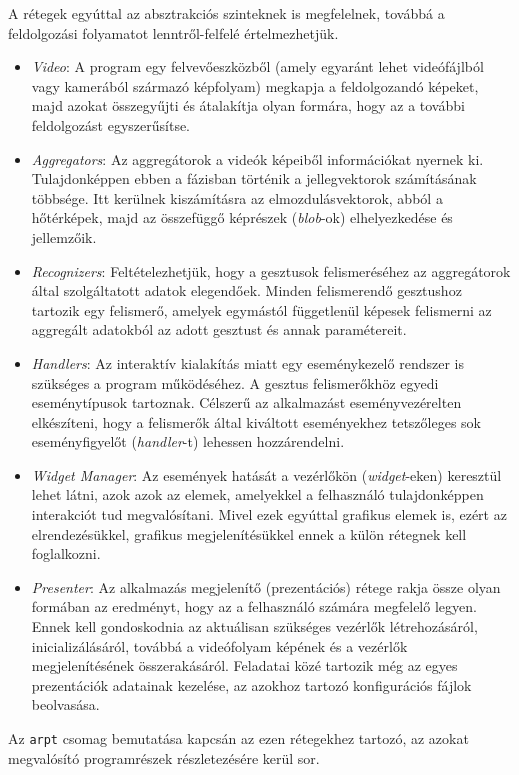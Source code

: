A rétegek egyúttal az absztrakciós szinteknek is megfelelnek, továbbá a feldolgozási folyamatot lenntről-felfelé értelmezhetjük.
\begin{itemize}
\item \textit{Video}: A program egy felvevőeszközből (amely egyaránt lehet videófájlból vagy kamerából származó képfolyam) megkapja a feldolgozandó képeket, majd azokat összegyűjti és átalakítja olyan formára, hogy az a további feldolgozást egyszerűsítse.
\item \textit{Aggregators}: Az aggregátorok a videók képeiből információkat nyernek ki. Tulajdonképpen ebben a fázisban történik a jellegvektorok számításának többsége. Itt kerülnek kiszámításra az elmozdulásvektorok, abból a hőtérképek, majd az összefüggő képrészek (\textit{blob}-ok) elhelyezkedése és jellemzőik.
\item \textit{Recognizers}: Feltételezhetjük, hogy a gesztusok felismeréséhez az aggregátorok által szolgáltatott adatok elegendőek. Minden felismerendő gesztushoz tartozik egy felismerő, amelyek egymástól függetlenül képesek felismerni az aggregált adatokból az adott gesztust és annak paramétereit.
\item \textit{Handlers}: Az interaktív kialakítás miatt egy eseménykezelő rendszer is szükséges a program működéséhez. A gesztus felismerőkhöz egyedi eseménytípusok tartoznak. Célszerű az alkalmazást eseményvezérelten elkészíteni, hogy a felismerők által kiváltott eseményekhez tetszőleges sok eseményfigyelőt (\textit{handler}-t) lehessen hozzárendelni.
\item \textit{Widget Manager}: Az események hatását a vezérlőkön (\textit{widget}-eken) keresztül lehet látni, azok azok az elemek, amelyekkel a felhasználó tulajdonképpen interakciót tud megvalósítani. Mivel ezek egyúttal grafikus elemek is, ezért az elrendezésükkel, grafikus megjelenítésükkel ennek a külön rétegnek kell foglalkozni.
\item \textit{Presenter}: Az alkalmazás megjelenítő (prezentációs) rétege rakja össze olyan formában az eredményt, hogy az a felhasználó számára megfelelő legyen. Ennek kell gondoskodnia az aktuálisan szükséges vezérlők létrehozásáról, inicializálásáról, továbbá a videófolyam képének és a vezérlők megjelenítésének összerakásáról. Feladatai közé tartozik még az egyes prezentációk adatainak kezelése, az azokhoz tartozó konfigurációs fájlok beolvasása.
\end{itemize}
Az \texttt{arpt} csomag bemutatása kapcsán az ezen rétegekhez tartozó, az azokat megvalósító programrészek részletezésére kerül sor.


